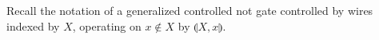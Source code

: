 Recall the notation of a generalized controlled not gate controlled by wires indexed by $X$, operating on $x\notin X$ by $\llparenthesis X,x\rrparenthesis$.


%
%






